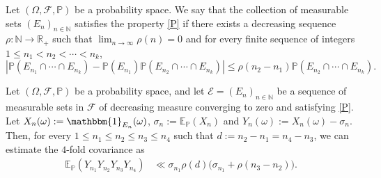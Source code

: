 \documentclass[10pt,a4paper]{amsart}
\newcommand{\N}{{\mathbb N}}
\begin{document}
 \begin{definition} Let $(\Omega,\mathcal{F},\mathbb{P})$ be a probability space. We say that the collection of measurable sets $(E_n)_{n\in\N}$ satisfies the property \eqref{P} if there exists a decreasing sequence $\rho:\N\to \mathbb{R}_{+}$  such that $\displaystyle \lim_{n\to\infty}\rho(n)=0$ and  for every finite sequence of integers $1 \leq n_1<n_2<\cdots<n_k$,
 \begin{equation}
     \left|\mathbb{P}(E_{n_1} \cap \cdots \cap E_{n_k})-\mathbb{P}(E_{n_1})\mathbb{P}(E_{n_2}\cap \cdots \cap E_{n_k})\right|\leq \rho(n_2-n_1)\mathbb{P}(E_{n_2}\cap \cdots \cap E_{n_k}).  \tag{P}\label{P}
 \end{equation}
 \end{definition}

\begin{lemma} Let $(\Omega,\mathcal{F},\mathbb{P})$ be a probability space, and let $\mathcal{E}=(E_n)_{n\in \N}$ be a sequence of measurable sets in $\mathcal{F}$ of decreasing measure converging to zero and satisfying \eqref{P}. Let $X_n(\omega):=\mathbbm{1}_{E_n}(\omega)$, $\sigma_n:=\mathbb{E}_{\mathbb{P}}(X_n)$ and $Y_n(\omega):=X_n(\omega)-\sigma_n$. Then, for every $1\leq n_1\leq n_2\leq n_3\leq n_4$ such that $d:=n_2-n_1=n_4-n_3$, we can estimate the $4$-fold covariance as
\begin{align*}
    \mathbb{E}_{\mathbb{P}}\left( Y_{n_1} Y_{n_2} Y_{n_3} Y_{n_4} \right)&\ll  \sigma_{n_1}\rho(d)\Big(\sigma_{n_1}+\rho(n_3-n_2)\Big).
\end{align*}\label{key}
\end{lemma}
\end{document}
